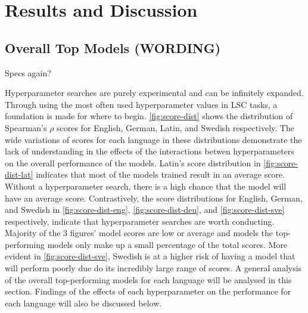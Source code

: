 \section{Results and Discussion}

\subsection{Overall Top Models (WORDING)}
Specs again?

Hyperparameter searches are purely experimental and can be infinitely expanded. Through using the most often used hyperparameter values in LSC tasks, a foundation is made for where to begin. \autoref{fig:score-dist} shows the distribution of Spearman's $\rho$ scores for English, German, Latin, and Swedish respectively. The wide variations of scores for each language in these distributions demonstrate the lack of understanding in the effects of the interactions betwen hyperparameters on the overall performance of the models. Latin's score distribution in \autoref{fig:score-dist-lat} indicates that most of the models trained result in an average score. Without a hyperparameter search, there is a high chance that the model will have an average score. Contrastively, the score distributions for English, German, and Swedish in  \autoref{fig:score-dist-eng}, \autoref{fig:score-dist-deu}, and \autoref{fig:score-dist-sve} respectively, indicate that hyperparameter searches are worth conducting. Majority of the 3 figures' model scores are low or average and models the top-performing models only make up a small percentage of the total scores. More evident in \autoref{fig:score-dist-sve}, Swedish is at a higher risk of having a model that will perform poorly due do its incredibly large range of scores. A general analysis of the overall top-performing models for each language will be analysed in this section. Findings of the effects of each hyperparameter on the performance for each language will also be discussed below. 


